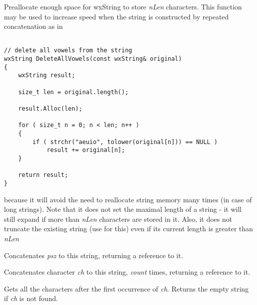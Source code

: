 \label{wxstringalloc}


Preallocate enough space for wxString to store {\it nLen} characters. This function
may be used to increase speed when the string is constructed by repeated
concatenation as in

\begin{verbatim}

// delete all vowels from the string
wxString DeleteAllVowels(const wxString& original)
{
    wxString result;

    size_t len = original.length();

    result.Alloc(len);

    for ( size_t n = 0; n < len; n++ )
    {
        if ( strchr("aeuio", tolower(original[n])) == NULL )
            result += original[n];
    }

    return result;
}

\end{verbatim}

because it will avoid the need to reallocate string memory many times (in case
of long strings). Note that it does not set the maximal length of a string - it
will still expand if more than {\it nLen} characters are stored in it. Also, it
does not truncate the existing string (use 
 for this) even if its current length is
greater than {\it nLen}

\label{wxstringappend}


Concatenates {\it psz} to this string, returning a reference to it.


Concatenates character {\it ch} to this string, {\it count} times, returning a reference
to it.

\label{wxstringafterfirst}


Gets all the characters after the first occurrence of {\it ch}.
Returns the empty string if {\it ch} is not found.

\label{wxstringafterlast}


